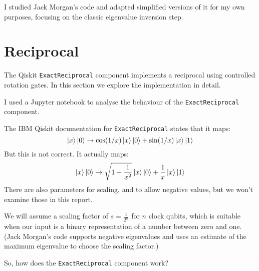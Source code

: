 \documentclass[12pt]{extarticle}
\begin{document}
I studied Jack Morgan's code and adapted simplified versions of it for my own purposes, focusing on the classic eigenvalue inversion step.

\section{Reciprocal}\label{sec:reciprocal}

The Qiskit \texttt{ExactReciprocal} component \cite{ibm_exact_reciprocal} implements a reciprocal using controlled rotation gates.
In this section we explore the implementation in detail.

I used a Jupyter notebook \cite{github_project_exactreciprocal} to analyse the behaviour of the \texttt{ExactReciprocal} component.

The IBM Qiskit documentation for \texttt{ExactReciprocal} states that it maps:
\[
\ket{x}\ket{0} \rightarrow \cos(1/x)\ket{x}\ket{0} + \sin(1/x)\ket{x}\ket{1}
\]
But this is not correct. It actually maps:
\[
\ket{x}\ket{0} \rightarrow \sqrt{1-\frac{1}{x^2}}\ket{x}\ket{0} + \frac{1}{x}\ket{x}\ket{1}
\]
There are also parameters for scaling, and to allow negative values, but we won't examine those in this report.

We will assume a scaling factor of $s=\frac{1}{2^n}$ for $n$ clock qubits, which is suitable when our input is a binary representation of a number between zero and one.
(Jack Morgan's code supports negative eigenvalues and uses an estimate of the maximum eigenvalue to choose the scaling factor.)

So, how does the \texttt{ExactReciprocal} component work?
\end{document}
